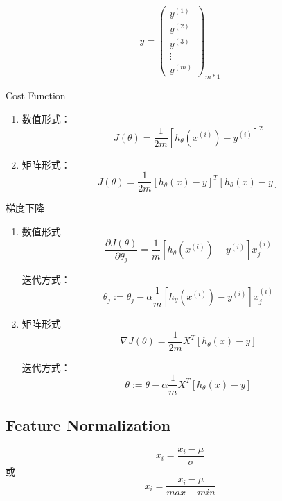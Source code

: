\begin{equation}
	y = \left(\begin{matrix}
		y^{(1)} \\ y^{(2)} \\ y^{(3)} \\ \vdots \\ y^{(m)}
	\end{matrix}\right)_{m*1}
\end{equation}


Cost Function
\begin{enumerate}
\item 数值形式：
\begin{equation}
	J(\theta) = \frac{1}{2m} \left[ h_\theta(x^{(i)}) - y^{(i)}\right]^2
\end{equation}

\item 矩阵形式：
\begin{equation}
	J(\theta) = \frac{1}{2m} \left[h_\theta(x) - y\right]^T \left[ h_\theta(x) - y\right]
\end{equation}
\end{enumerate}

梯度下降
\begin{enumerate}
\item 数值形式
\begin{equation}
	\frac{\partial J(\theta)}{\partial \theta_j} =
	    \frac{1}{m} \left[ h_\theta(x^{(i)}) - y^{(i)} \right] x_j^{(i)}
\end{equation}

迭代方式：
\begin{equation}
	\theta_j := \theta_j - \alpha \frac{1}{m} \left[h_\theta(x^{(i)}) - y^{(i)}\right] x_j^{(i)}
\end{equation}

\item 矩阵形式
\begin{equation}
	\nabla J(\theta) = \frac{1}{2m} X^T \left[h_\theta(x) - y\right]
\end{equation}

迭代方式：
\begin{equation}
	\theta := \theta - \alpha \frac{1}{m} X^T \left[ h_\theta(x) - y\right]
\end{equation}
\end{enumerate}



\subsection{Feature Normalization}
\begin{equation}
	x_i = \frac{x_i - \mu}{\sigma}
\end{equation}
或
\begin{equation}
	x_i = \frac{x_i - \mu}{max - min}
\end{equation}



